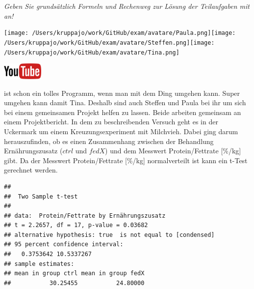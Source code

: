 \documentclass[a4paper, 9pt]{scrartcl}\usepackage[]{graphicx}\usepackage[]{xcolor}
\makeatletter
\newenvironment{kframe}{%
 \def\at@end@of@kframe{}%
 \ifinner\ifhmode%
  \def\at@end@of@kframe{\end{minipage}}%
  \begin{minipage}{\columnwidth}%
 \fi\fi%
 \def\FrameCommand##1{\hskip\@totalleftmargin \hskip-\fboxsep
 \colorbox{shadecolor}{##1}\hskip-\fboxsep
     \hskip-\linewidth \hskip-\@totalleftmargin \hskip\columnwidth}%
 \MakeFramed {\advance\hsize-\width
   \@totalleftmargin\z@ \linewidth\hsize
   \@setminipage}}%
 {\par\unskip\endMakeFramed%
 \at@end@of@kframe}
\newenvironment{knitrout}{}{} %
\makeatother
\begin{document}
\textit{Geben Sie grundsätzlich Formeln und Rechenweg zur Lösung der Teilaufgaben mit an!} \\[1Ex]
 

 
\begin{minipage}[t]{0.5\textwidth}
\texttt{[image: /Users/kruppajo/work/GitHub/exam/avatare/Paula.png]}\hspace{-4mm}\texttt{[image: /Users/kruppajo/work/GitHub/exam/avatare/Steffen.png]}\hspace{-4mm}\texttt{[image: /Users/kruppajo/work/GitHub/exam/avatare/Tina.png]}
\end{minipage}
\begin{minipage}[t]{0.5\textwidth}
\hfill
\href{https://youtu.be/w62HJlbN28U}{\includegraphics[width = 2cm]{img/youtube}}
\end{minipage}
\vspace{1ex}



\Rlogo ist schon ein tolles Programm, wenn man mit dem Ding umgehen kann. Super umgehen kann damit Tina. Deshalb sind auch Steffen und Paula bei ihr um sich bei einem gemeinsamen Projekt helfen zu lassen. Beide arbeiten gemeinsam an einem Projektbericht. In dem zu beschreibenden Versuch geht es in der Uckermark um einem Kreuzungsexperiment mit Milchvieh. Dabei ging darum herauszufinden, ob es einen Zusammenhang zwischen der Behandlung Ernährungszusatz ($ctrl$ und $fedX$) und dem Messwert Protein/Fettrate [\%/kg] gibt. Da der Messwert Protein/Fettrate [\%/kg] normalverteilt ist kann ein t-Test gerechnet werden.

\begin{knitrout}
\color{fgcolor}\begin{kframe}
\begin{verbatim}
## 
## 	Two Sample t-test
## 
## data:  Protein/Fettrate by Ernährungszusatz
## t = 2.2657, df = 17, p-value = 0.03682
## alternative hypothesis: true  is not equal to [condensed]
## 95 percent confidence interval:
##   0.3753642 10.5337267
## sample estimates:
## mean in group ctrl mean in group fedX 
##           30.25455           24.80000
\end{verbatim}
\end{kframe}
\end{knitrout}
\end{document}
